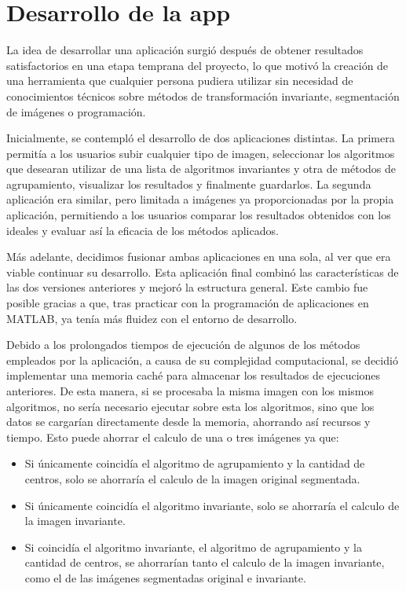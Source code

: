 \section{Desarrollo de la app}\label{desarrollo-de-la-app}

La idea de desarrollar una aplicación surgió después de obtener resultados satisfactorios en una etapa temprana del proyecto, lo que motivó la creación de una herramienta que cualquier persona pudiera utilizar sin necesidad de conocimientos técnicos sobre métodos de transformación invariante, segmentación de imágenes o programación.

Inicialmente, se contempló el desarrollo de dos aplicaciones distintas. La primera permitía a los usuarios subir cualquier tipo de imagen, seleccionar los algoritmos que desearan utilizar de una lista de algoritmos invariantes y otra de métodos de agrupamiento, visualizar los resultados y finalmente guardarlos. La segunda aplicación era similar, pero limitada a imágenes ya proporcionadas por la propia aplicación, permitiendo a los usuarios comparar los resultados obtenidos con los ideales y evaluar así la eficacia de los métodos aplicados.

Más adelante, decidimos fusionar ambas aplicaciones en una sola, al ver que era viable continuar su desarrollo. Esta aplicación final combinó las características de las dos versiones anteriores y mejoró la estructura general. Este cambio fue posible gracias a que, tras practicar con la programación de aplicaciones en MATLAB, ya tenía más fluidez con el entorno de desarrollo.

Debido a los prolongados tiempos de ejecución de algunos de los métodos empleados por la aplicación, a causa de su complejidad computacional, se decidió implementar una memoria caché para almacenar los resultados de ejecuciones anteriores. De esta manera, si se procesaba la misma imagen con los mismos algoritmos, no sería necesario ejecutar sobre esta los algoritmos, sino que los datos se cargarían directamente desde la memoria, ahorrando así recursos y tiempo. Esto puede ahorrar el calculo de una o tres imágenes ya que:

\begin{itemize}
    \item Si únicamente coincidía el algoritmo de agrupamiento y la cantidad de centros, solo se ahorraría el calculo de la imagen original segmentada.
    \item Si únicamente coincidía el algoritmo invariante, solo se ahorraría el calculo de la imagen invariante.
    \item Si coincidía  el algoritmo invariante, el algoritmo de agrupamiento y la cantidad de centros, se ahorrarían tanto el calculo de la imagen invariante, como el de las imágenes segmentadas original e invariante.
\end{itemize}

